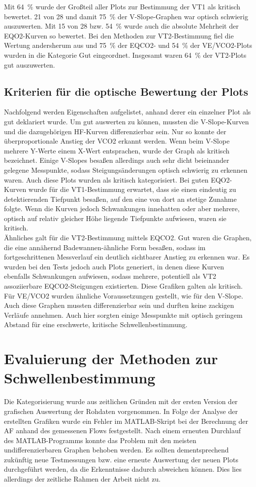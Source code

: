 %
Mit 64~\% wurde der Großteil aller Plots zur Bestimmung der VT1 als kritisch bewertet. 21 von 28 und damit 75~\% der V-Slope-Graphen war optisch schwierig auszuwerten. Mit 15 von 28 bzw. 54~\% wurde auch die absolute Mehrheit der \gls{EQO2}-Kurven so bewertet. Bei den Methoden zur VT2-Bestimmung fiel die Wertung andersherum aus und 75~\% der \gls{EQCO2}- und 54~\% der \gls{VE}/\gls{VCO2}-Plots wurden in die Kategorie Gut eingeordnet. Insgesamt waren 64~\% der VT2-Plots gut auszuwerten.
%
\subsection{Kriterien für die optische Bewertung der Plots}
%
Nachfolgend werden Eigenschaften aufgelistet, anhand derer ein einzelner Plot als gut deklariert wurde. Um gut auswerten zu können, mussten die V-Slope-Kurven und die dazugehörigen \gls{HF}-Kurven differenzierbar sein. Nur so konnte der überproportionale Anstieg der \gls{VCO2} erkannt werden. Wenn beim V-Slope mehrere Y-Werte einem X-Wert entsprachen, wurde der Graph als kritisch bezeichnet. Einige V-Slopes besaßen allerdings auch sehr dicht beieinander gelegene Messpunkte, sodass Steigungsänderungen optisch schwierig zu erkennen waren. Auch diese Plots wurden als kritisch kategorisiert.
\clearpage
Bei guten \gls{EQO2}-Kurven wurde für die VT1-Bestimmung erwartet, dass sie einen eindeutig zu detektierenden Tiefpunkt besaßen, auf den eine von dort an stetige Zunahme folgte. Wenn die Kurven jedoch Schwankungen innehatten oder aber mehrere, optisch auf relativ gleicher Höhe liegende Tiefpunkte aufwiesen, waren sie kritisch.\\
Ähnliches galt für die VT2-Bestimmung mittels \gls{EQCO2}. Gut waren die Graphen, die eine annähernd Badewannen-ähnliche Form besaßen, sodass im fortgeschrittenen Messverlauf ein deutlich sichtbarer Anstieg zu erkennen war. Es wurden bei den Tests jedoch auch Plots generiert, in denen diese Kurven ebenfalls Schwankungen aufwiesen, sodass mehrere, potentiell als VT2 assoziierbare \gls{EQCO2}-Steigungen existierten. Diese Grafiken galten als kritisch.\\
Für \gls{VE}/\gls{VCO2} wurden ähnliche Voraussetzungen gestellt, wie für den V-Slope. Auch diese Graphen mussten differenzierbar sein und durften keine zackigen Verläufe annehmen. Auch hier sorgten einige Messpunkte mit optisch geringem Abstand für eine erschwerte, kritische Schwellenbestimmung. 
%
\section{Evaluierung der Methoden zur Schwellenbestimmung}
%
Die Kategorisierung wurde aus zeitlichen Gründen mit der ersten Version der grafischen Auswertung der Rohdaten vorgenommen. In Folge der Analyse der erstellten Grafiken wurde ein Fehler im MATLAB-Skript bei der Berechnung der \gls{AF} anhand des gemessenen Flows festgestellt. Nach einem erneuten Durchlauf des MATLAB-Programms konnte das Problem mit den meisten undifferenzierbaren Graphen behoben werden. Es sollten dementsprechend zukünftig neue Testmessungen bzw. eine erneute Auswertung der neuen Plots durchgeführt werden, da die Erkenntnisse dadurch abweichen können. Dies lies allerdings der zeitliche Rahmen der Arbeit nicht zu.
%
